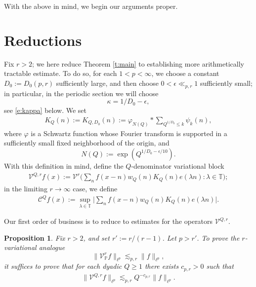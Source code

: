 \documentclass[12pt]{amsart}
\numberwithin{equation}{section}
\newtheorem{proposition}[theorem]{Proposition}
\theoremstyle{definition}
\begin{document}
With the above in mind, we begin our arguments proper.

\section{Reductions}\label{s:red}
Fix \(r>2\); we here reduce Theorem \ref{t:main} to establishing more arithmetically tractable estimate. To do so, for each $1 < p < \infty$, we choose a constant $D_0 := D_0(p,r)$ sufficiently large, and then choose $0 < \epsilon \ll_{p,r} 1$ sufficiently small; in particular, in the periodic section we will choose
\[
    \kappa=1/D_0-\epsilon,
\]
see \eqref{e:kappa} below.  We set
\begin{align}\label{e:KQ}
    K_Q(n):=K_{Q,D_0}(n)
    :=
    \varphi_{N(Q)}*
    \sum_{Q^{1/D_0}\leq k}\psi_k(n),
\end{align}
where \(\varphi\) is a Schwartz function whose Fourier transform is supported
in a sufficiently small fixed neighborhood of the origin, and
\[
    N(Q):=\exp(Q^{1/D_0-\epsilon/10}).
\]
With this definition in mind, define the \(Q\)-denominator variational block
\begin{align}\label{e:CQvar}
    \mathcal V^{Q,r}f(x)
    :=
    \mathcal V^r
    \big(
    \sum_n f(x-n)w_Q(n)K_Q(n)e(\lambda n) : \lambda \in \mathbb{T}
    \big); 
\end{align}
in the limiting $r \to \infty$ case, we define
\begin{align}
    \mathcal C^{Q}f(x)
    :=
    \sup_{\lambda \in \mathbb{T}}
    \big|
    \sum_n f(x-n)w_Q(n)K_Q(n)e(\lambda n)\big|.
\end{align}



Our first order of business is to reduce to estimates for the operators
\(\mathcal V^{Q,r}\).

\begin{proposition}\label{p:red-var}
Fix \(r>2\), and set \(r':=r/(r-1)\).  Let \(p>r'\).  To prove the
\(r\)-variational analogue
\[
        \|\mathcal V_{\mathbb P}^{r}f\|_{\ell^p}
        \lesssim_{p,r}
        \|f\|_{\ell^p},
\]
it suffices to prove that for each dyadic \(Q\geq1\) there exists \(c_{p,r}>0\)
such that
\begin{align}\label{e:red-var}
        \|\mathcal V^{Q,r}f\|_{\ell^p}
        \lesssim_{p,r}
        Q^{-c_{p,r}}\|f\|_{\ell^p}.
\end{align}
\end{proposition}
\end{document}
